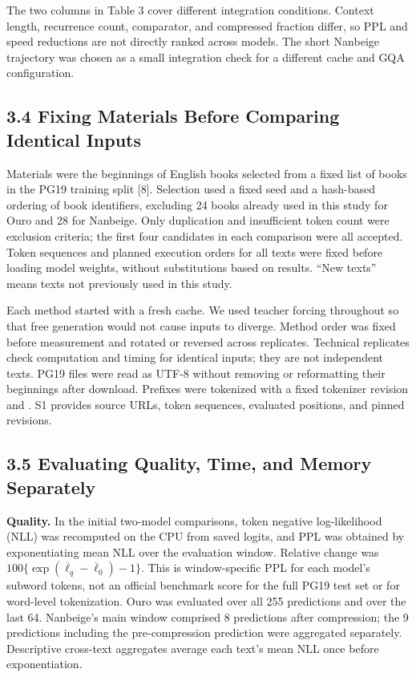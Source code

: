 \documentclass[10pt,a4paper]{article}
\begin{document}
The two columns in Table 3 cover different integration conditions. Context length, recurrence count, comparator, and compressed fraction differ, so PPL and speed reductions are not directly ranked across models. The short Nanbeige trajectory was chosen as a small integration check for a different cache and GQA configuration.

\subsection{3.4 Fixing Materials Before Comparing Identical Inputs}\label{fixing-materials-before-comparing-identical-inputs}

Materials were the beginnings of English books selected from a fixed list of books in the PG19 training split {[}8{]}. Selection used a fixed seed and a hash-based ordering of book identifiers, excluding 24 books already used in this study for Ouro and 28 for Nanbeige. Only duplication and insufficient token count were exclusion criteria; the first four candidates in each comparison were all accepted. Token sequences and planned execution orders for all texts were fixed before loading model weights, without substitutions based on results. ``New texts'' means texts not previously used in this study.

Each method started with a fresh cache. We used teacher forcing throughout so that free generation would not cause inputs to diverge. Method order was fixed before measurement and rotated or reversed across replicates. Technical replicates check computation and timing for identical inputs; they are not independent texts. PG19 files were read as UTF-8 without removing or reformatting their beginnings after download. Prefixes were tokenized with a fixed tokenizer revision and \texttt{}. S1 provides source URLs, token sequences, evaluated positions, and pinned revisions.

\subsection{3.5 Evaluating Quality, Time, and Memory Separately}\label{evaluating-quality-time-and-memory-separately}

\textbf{Quality.} In the initial two-model comparisons, token negative log-likelihood (NLL) was recomputed on the CPU from saved logits, and PPL was obtained by exponentiating mean NLL over the evaluation window. Relative change was \(100\{\exp(\overline{\ell}_{q}-\overline{\ell}_{0})-1\}\). This is window-specific PPL for each model's subword tokens, not an official benchmark score for the full PG19 test set or for word-level tokenization. Ouro was evaluated over all 255 predictions and over the last 64. Nanbeige's main window comprised 8 predictions after compression; the 9 predictions including the pre-compression prediction were aggregated separately. Descriptive cross-text aggregates average each text's mean NLL once before exponentiation.
\end{document}
